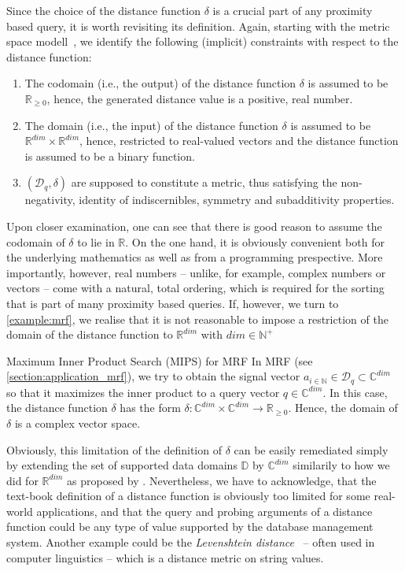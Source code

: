 Since the choice of the distance function $\delta$ is a crucial part of any proximity based query, it is worth revisiting its definition. Again, starting with the metric space modell~\cite{Zezula:2006similarity}, we identify the following (implicit) constraints with respect to the distance function:

\begin{enumerate}
    \item The codomain (i.e., the output) of the distance function $\delta$ is assumed to be $\mathbb{R}_{\geq 0}$, hence, the generated distance value is a positive, real number.
    \item The domain (i.e., the input) of the distance function $\delta$ is assumed to be $\mathbb{R}^{dim} \times \mathbb{R}^{dim}$, hence, restricted to real-valued vectors and the distance function is assumed to be a binary function.
    \item $(\mathcal{D}_q,\delta)$ are supposed to constitute a metric, thus satisfying the non-negativity, identity of indiscernibles, symmetry and subadditivity properties.
\end{enumerate}

Upon closer examination, one can see that there is good reason to assume the codomain of $\delta$ to lie in $\mathbb{R}$. On the one hand, it is obviously convenient both for the underlying mathematics as well as from a programming prespective. More importantly, however, real numbers -- unlike, for example, complex numbers or vectors -- come with a natural, total ordering, which is required for the sorting that is part of many proximity based queries. If, however, we turn to \cref{example:mrf}, we realise that it is not reasonable to impose a restriction of the domain of the distance function to $\mathbb{R}^{dim}$ with $dim \in \mathbb{N^{+}}$

\begin{example}[label=example:mrf]{Maximum Inner Product Search (MIPS) for MRF}{}
    In MRF (see \cref{section:application_mrf}), we try to obtain the signal vector $a_{i \in \mathbb{N}} \in \mathcal{D}_q \subset \mathbb{C}^{dim}$ so that it maximizes the inner product to a query vector $q \in \mathbb{C}^{dim}$. In this case, the distance function $\delta$ has the form $\delta \colon \mathbb{C}^{dim} \times \mathbb{C}^{dim} \to \mathbb{R}_{\geq 0}$. Hence, the domain of $\delta$ is a complex vector space.
\end{example}

Obviously, this limitation of the definition of $\delta$ can be easily remediated simply by extending the set of supported data domains $\mathbb{D}$ by $\mathbb{C}^{dim}$ similarily to how we did for $\mathbb{R}^{dim}$ as proposed by \cite{Giangreco:2018thesis}. Nevertheless, we have to acknowledge, that the text-book definition of a distance function is obviously too limited for some real-world applications, and that the query and probing arguments of a distance function could be any type of value supported by the database management system. Another example could be the \emph{Levenshtein distance}~\cite{Levensthtein:1965Binary} -- often used in computer linguistics -- which is a distance metric on string values.

